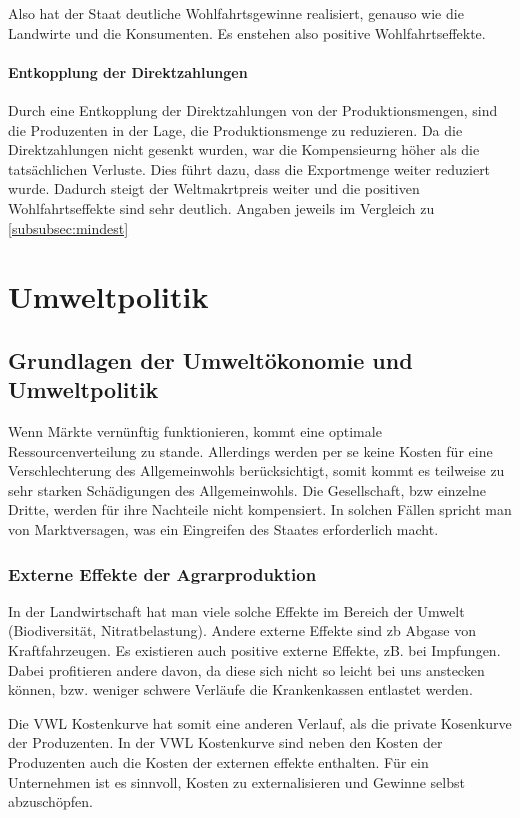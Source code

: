 \documentclass[11pt]{scrbook}
\begin{document}
Also hat der Staat deutliche Wohlfahrtsgewinne realisiert, genauso wie die Landwirte und die Konsumenten.
Es enstehen also positive Wohlfahrtseffekte.

\subsubsection{Entkopplung der Direktzahlungen}
Durch eine Entkopplung der Direktzahlungen von der Produktionsmengen, sind die Produzenten in der Lage, die Produktionsmenge zu reduzieren.
Da die Direktzahlungen nicht gesenkt wurden, war die Kompensieurng höher als die tatsächlichen Verluste.
Dies führt dazu, dass die Exportmenge weiter reduziert wurde.
Dadurch steigt der Weltmakrtpreis weiter und die positiven Wohlfahrtseffekte sind sehr deutlich.
Angaben jeweils im Vergleich zu \cref{subsubsec:mindest}


\chapter{Umweltpolitik}
\setcounter{section}{0}
\section{Grundlagen der Umweltökonomie und Umweltpolitik}
Wenn Märkte vernünftig funktionieren, kommt eine optimale Ressourcenverteilung zu stande.
Allerdings werden per se keine Kosten für eine Verschlechterung des Allgemeinwohls berücksichtigt, somit kommt es teilweise zu sehr starken Schädigungen des Allgemeinwohls.
Die Gesellschaft, bzw einzelne Dritte, werden für ihre Nachteile nicht kompensiert.
In solchen Fällen spricht man von Marktversagen, was ein Eingreifen des Staates erforderlich macht.

\subsection{Externe Effekte der Agrarproduktion}
In der Landwirtschaft hat man viele solche Effekte im Bereich der Umwelt (Biodiversität, Nitratbelastung).
Andere externe Effekte sind zb Abgase von Kraftfahrzeugen.
Es existieren auch positive externe Effekte, zB. bei Impfungen.
Dabei profitieren andere davon, da diese sich nicht so leicht bei uns anstecken können, bzw. weniger schwere Verläufe die Krankenkassen entlastet werden.

Die \ac{VWL} Kostenkurve hat somit eine anderen Verlauf, als die private Kosenkurve der Produzenten.
In der \ac{VWL} Kostenkurve sind neben den Kosten der Produzenten auch die Kosten der externen effekte enthalten.
Für ein Unternehmen ist es sinnvoll, Kosten zu externalisieren und Gewinne selbst abzuschöpfen.
\end{document}
